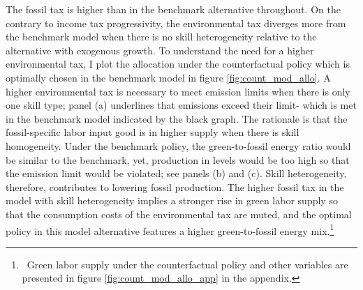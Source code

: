 The fossil tax is higher than in the benchmark alternative throughout. 
On the contrary to income tax progressivity, the environmental tax diverges more from the benchmark model when there is no skill heterogeneity relative to the alternative with exogenous growth.
To understand the need for a higher environmental tax, I plot the allocation under the counterfactual policy which is optimally chosen in the benchmark model in figure \ref{fig:count_mod_allo}. 
A higher environmental tax is necessary to meet emission limits when there is only one skill type; panel (a) underlines that emissions exceed their limit- which is met in the benchmark model indicated by the black graph. The rationale is that the fossil-specific labor input good is in higher supply when there is skill homogeneity. Under the benchmark policy, the green-to-fossil energy ratio would be similar to the benchmark, yet, production in levels would be too high so that the emission limit would be violated; see panels (b) and (c). Skill heterogeneity, therefore, contributes to lowering fossil production. The higher fossil tax in the model with skill heterogeneity implies a stronger rise in green labor supply so that the consumption costs of the environmental tax are muted, and the optimal policy in this model alternative features a higher green-to-fossil energy mix.\footnote{\ Green labor supply under the counterfactual policy and other variables are presented in figure \ref{fig:count_mod_allo_app} in the appendix. }





